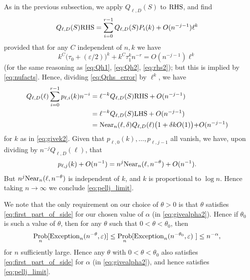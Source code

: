 \documentclass{memo-l}
\theoremstyle{plain}
\theoremstyle{definition}
\numberwithin{section}{chapter}
\numberwithin{equation}{chapter}
\DeclareMathOperator{\Prob}{Prob}
\theoremstyle{plain}
\theoremstyle{definition}
\begin{document}
As in the previous subsection, we apply $Q_{\ell,D}(S)$ to ${\rm RHS}$, and
find \begin{equation}\label{eq:Qrhs_error} Q_{\ell,D}(S){\rm RHS} =
\sum_{i=0}^{r-1} Q_{\ell,D}(S) P_i(k) + O(n^{-j-1})\ell^k \end{equation}
provided that for any $C$ independent of $n,k$ we have \[ k^C
\bigl(\tau_0+(\varepsilon/2)\bigr)^k + k^C \tau_1^k n^{-r} =
O(n^{-j-1})\ell^k \] (for the same reasoning as \eqref{eq:Qh1},
\eqref{eq:Qh2}, \eqref{eq:rhs2}); but this is implied by
\eqref{eq:nufacts}.
% 
Hence, dividing \eqref{eq:Qrhs_error} by $\ell^k$, we have \begin{align*}
Q_{\ell,D}(\ell)\sum_{i=0}^{r-1} p_{\ell,i}(k) n^{-i} &= \ell^{-k}
Q_{\ell,D}(S){\rm RHS} + O(n^{-j-1})\\ &= \ell^{-k} Q_{\ell,D}(S){\rm LHS}
+ O(n^{-j-1})\\ &= {\rm Near}_n(\ell,\delta) Q_{\ell,D}(\ell) \bigr( 1 +
\delta k O(1) \bigl) + O(n^{-j-1}) \end{align*} for $k$ as in
\eqref{eq:givek2}.  Given that $p_{\ell,0}(k),\ldots,p_{\ell,j-1}$ all
vanish, we have, upon dividing by $n^{-j}Q_{\ell,D}(\ell)$, that \[
p_{\ell,j}(k) + O(n^{-1}) = n^j {\rm Near}_n(\ell,n^{-\theta}) + O(n^{-1}).
\] But $n^j {\rm Near}_n(\ell,n^{-\theta})$ is independent of $k$, and $k$
is proportional to $\log n$.  Hence taking $n\to\infty$ we conclude
\eqref{eq:pellj_limit}.

We note that the only requirement on our choice of $\theta>0$ is that
$\theta$ satisfies \eqref{eq:first_part_of_side} for our chosen value of
$\alpha$ (in \eqref{eq:givealpha2}).  Hence if $\theta_0$ is such a value
of $\theta$, then for any $\theta$ such that $0<\theta<\theta_0$, then \[
\Prob_n[{\rm Exception}_n(n^{-\theta},\varepsilon)] \le \Prob_n[ {\rm
Exception}_n(n^{-\theta_0},\varepsilon) ] \leq n^{-\alpha}, \] for $n$
sufficiently large.  Hence any $\theta$ with $0<\theta<\theta_0$ also
satisfies \eqref{eq:first_part_of_side} for $\alpha$ (in
\eqref{eq:givealpha2}), and hence satisfies \eqref{eq:pellj_limit}.
\end{document}
